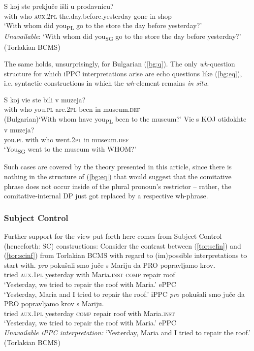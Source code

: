 \documentclass[output=paper,colorlinks,citecolor=brown]{langscibook}
\begin{document}
\ea
\gll S koj ste prekjuče išli u prodavnicu? \\
 with who \textsc{aux.2pl} the.day.before.yesterday gone in shop \\
 \glt `With whom did you\textsubscript{PL} go to the store the day before yesterday?'\\
 \textit{Unavailable}: `With whom did you\textsubscript{SG} go to the store the day before yesterday?' \hfill (Torlakian BCMS)
\z

\noindent The same holds, unsurprisingly, for Bulgarian (\ref{bg:q}). The only \textit{wh}-question structure for which iPPC interpretations arise are echo questions like (\ref{bg:eq}), i.e. syntactic constructions in which the \textit{wh}-element remains \textit{in situ}.

\ea \ea
\gll S koj vie ste bili v muzeja? \\
 with who you.\textsc{pl} are.\textsc{2pl} been in museum.\textsc{def} \\
 \hfill (Bulgarian)\glt `With whom have you\textsubscript{PL} been to the museum?' \label{bg:q}
\ex
\gll Vie s KOJ otidokhte v muzeja? \\
 you.\textsc{pl} with who went.\textsc{2pl} in museum.\textsc{def} \\
 \glt `You\textsubscript{SG} went to the museum with WHOM?' \label{bg:eq}
\z \z 

\noindent Such cases are covered by the theory presented in this article, since there is nothing in the structure of (\ref{bg:eq}) that would suggest that the comitative phrase does not occur inside of the plural pronoun's restrictor -- rather, the comitative-internal DP just got replaced by a respective wh-phrase.



\subsubsection{Subject Control}\label{sec:sc}
Further support for the view put forth here comes from Subject Control (henceforth: SC) constructions: Consider the contrast between (\ref{tor:scfin}) and (\ref{tor:scinf}) from Torlakian BCMS with regard to (im)possible interpretations to start with.
\ea \ea
\gll \textit{pro} pokušali smo juče s Mariju da PRO popravljamo krov. \\
 {} tried \textsc{aux.1pl} yesterday with Maria.\textsc{inst} \textsc{comp} {} repair roof \\
 \glt `Yesterday, we tried to repair the roof with Maria.' \hfill ePPC\\
 `Yesterday, Maria and I tried to repair the roof.' \hfill iPPC\label{tor:scfin}
\ex
\gll \textit{pro} pokušali smo juče da PRO popravljamo krov s Mariju. \\
 {} tried \textsc{aux.1pl} yesterday \textsc{comp} {} repair roof with Maria.\textsc{inst} \\
 \glt `Yesterday, we tried to repair the roof with Maria.' \hfill ePPC\\
 \textit{Unavailable iPPC interpretation:} `Yesterday, Maria and I tried to repair the roof.' \label{tor:scinf}
\z \hfill (Torlakian BCMS)\z
\end{document}
